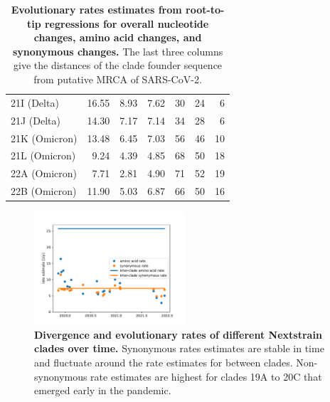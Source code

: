 \documentclass[aps,rmp, twocolumn]{revtex4}
\begin{document}
\begin{table}
\begin{tabular}{l|rrrrrr}
    21I (Delta) &     16.55 &     8.93 &      7.62 &       30 &      24 &        6 \\
    21J (Delta) &     14.30 &     7.17 &      7.14 &       34 &      28 &        6 \\
    21K (Omicron) &     13.48 &     6.45 &      7.03 &       56 &      46 &       10 \\
    21L (Omicron) &      9.24 &     4.39 &      4.85 &       68 &      50 &       18 \\
    22A (Omicron) &      7.71 &     2.81 &      4.90 &       71 &      52 &       19 \\
    22B (Omicron) &     11.90 &     5.03 &      6.87 &       66 &      50 &       16 \\
           \hline
    \end{tabular}
\caption{{\bf Evolutionary rates estimates from root-to-tip regressions for overall nucleotide changes, amino acid changes, and synonymous changes.}
    The last three columns give the distances of the clade founder sequence from putative MRCA of SARS-CoV-2.
\label{tab:rates}}
\end{table}

\begin{figure}
    \includegraphics[width=0.5\textwidth]{figures/rate_progression.pdf}
    \caption{{\bf Divergence and evolutionary rates of different Nextstrain clades over time.} Synonymous rates estimates are stable in time and fluctuate around the rate estimates for between clades. Non-synonymous rate estimates are highest for clades 19A to 20C that emerged early in the pandemic.
    \label{fig:rate_progression} }
\end{figure}

\end{document}
